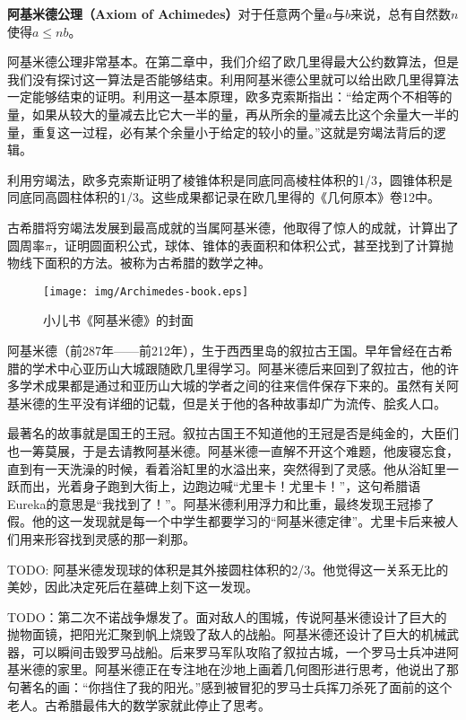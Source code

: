 \documentclass{article}
\begin{document}
\begin{axiom}
\textbf{阿基米德公理（Axiom of Achimedes）}对于任意两个量$a$与$b$来说，总有自然数$n$使得$a \leq nb$。
\end{axiom}

阿基米德公理非常基本。在第二章中，我们介绍了欧几里得最大公约数算法，但是我们没有探讨这一算法是否能够结束。利用阿基米德公里就可以给出欧几里得算法一定能够结束的证明。利用这一基本原理，欧多克索斯指出：“给定两个不相等的量，如果从较大的量减去比它大一半的量，再从所余的量减去比这个余量大一半的量，重复这一过程，必有某个余量小于给定的较小的量。”这就是穷竭法背后的逻辑。

利用穷竭法，欧多克索斯证明了棱锥体积是同底同高棱柱体积的1/3，圆锥体积是同底同高圆柱体积的1/3。这些成果都记录在欧几里得的《几何原本》卷12中\cite{HanXueTao16}。

古希腊将穷竭法发展到最高成就的当属阿基米德，他取得了惊人的成就，计算出了圆周率$\pi$，证明圆面积公式，球体、锥体的表面积和体积公式，甚至找到了计算抛物线下面积的方法。被称为古希腊的数学之神。

\begin{wrapfigure}{R}{0.4\textwidth}
 \centering
 \texttt{[image: img/Archimedes-book.eps]}
 \captionsetup{labelformat=empty}
 \caption{小儿书《阿基米德》的封面}
 \label{fig:Archimedes-book}
\end{wrapfigure}

阿基米德（前287年——前212年），生于西西里岛的叙拉古王国。早年曾经在古希腊的学术中心亚历山大城跟随欧几里得学习。阿基米德后来回到了叙拉古，他的许多学术成果都是通过和亚历山大城的学者之间的往来信件保存下来的。虽然有关阿基米德的生平没有详细的记载，但是关于他的各种故事却广为流传、脍炙人口。

最著名的故事就是国王的王冠。叙拉古国王不知道他的王冠是否是纯金的，大臣们也一筹莫展，于是去请教阿基米德。阿基米德一直解不开这个难题，他废寝忘食，直到有一天洗澡的时候，看着浴缸里的水溢出来，突然得到了灵感。他从浴缸里一跃而出，光着身子跑到大街上，边跑边喊“尤里卡！尤里卡！”，这句希腊语Eureka的意思是“我找到了！”。阿基米德利用浮力和比重，最终发现王冠掺了假。他的这一发现就是每一个中学生都要学习的“阿基米德定律”。尤里卡后来被人们用来形容找到灵感的那一刹那。

TODO: 阿基米德发现球的体积是其外接圆柱体积的2/3。他觉得这一关系无比的美妙，因此决定死后在墓碑上刻下这一发现。

TODO：第二次不诺战争爆发了。面对敌人的围城，传说阿基米德设计了巨大的抛物面镜，把阳光汇聚到帆上烧毁了敌人的战船。阿基米德还设计了巨大的机械武器，可以瞬间击毁罗马战船。后来罗马军队攻陷了叙拉古城，一个罗马士兵冲进阿基米德的家里。阿基米德正在专注地在沙地上画着几何图形进行思考，他说出了那句著名的画：“你挡住了我的阳光。”感到被冒犯的罗马士兵挥刀杀死了面前的这个老人。古希腊最伟大的数学家就此停止了思考。
\end{document}
